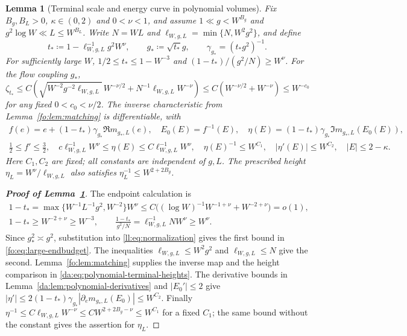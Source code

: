 \documentclass[11pt]{article}
\numberwithin{equation}{section}
\newtheorem{lemma}[theorem]{Lemma}
\theoremstyle{remark}
\newcommand{\ellstar}{\ell_{W,g,L}}
\begin{document}
\begin{lemma}[Terminal scale and energy curve in polynomial volumes]
\label{da:lem:polynomial-terminal}
Fix $B_g,B_L>0$, $\kappa\in(0,2)$ and $0<\nu<1$, and assume
$1\ll g<W^{B_g}$ and $g^2\log W\ll L\le W^{B_L}$.
Write $N=WL$ and $\ellstar=\min\{N,W^2g^2\}$, and define
\begin{equation}\label{ll:eq:endpoint}
 t_*\coloneqq1-\ellstar^{-1}g^2W^\nu,\qquad
 g_*\coloneqq\sqrt{t_*}g,\qquad \gamma_{g_*}=(t_*g^2)^{-1}.
\end{equation}
For sufficiently large $W$, $1/2\le t_*\le1-W^{-3}$ and
$(1-t_*)/(g^2/N)\ge W^\nu$. For the flow coupling $g_*$,
\begin{equation}\label{fo:eq:large-endbudget}
 \zeta_{t_*}\le C\left(
 \sqrt{W^{-2}g^{-2}\ellstar}\,W^{-\nu/2}
       +N^{-1}\ellstar W^{-\nu}\right)
 \le C(W^{-\nu/2}+W^{-\nu})\le W^{-c_0}
\end{equation}
for any fixed $0<c_0<\nu/2$. The inverse characteristic from
Lemma~\ref{fo:lem:matching} is differentiable, with
\begin{equation}\label{da:eq:polynomial-terminal-heights}
 \begin{gathered}
 f(e)=e+(1-t_*)\gamma_{g_*}\Re m_{g_*,L}(e),\quad
 E_0(E)=f^{-1}(E),\quad
 \eta(E)=(1-t_*)\gamma_{g_*}\Im m_{g_*,L}(E_0(E)),\\
 \tfrac12\le f'\le\tfrac32,\quad
 c\ellstar^{-1}W^\nu\le\eta(E)\le C\ellstar^{-1}W^\nu,\quad
 \eta(E)^{-1}\le W^{C_1},\quad |\eta'(E)|\le W^{C_2},\quad |E|\le2-\kappa.
 \end{gathered}
\end{equation}
Here $C_1,C_2$ are fixed; all constants are independent of $g,L$.
The prescribed height $\eta_L=W^\nu/\ellstar$ also satisfies
$\eta_L^{-1}\le W^{2+2B_g}$.
\end{lemma}
\begin{proof}[\textbf{Proof of Lemma~\ref{da:lem:polynomial-terminal}}]
The endpoint calculation is
\[
 \begin{gathered}
 1-t_*=\max\{W^{-1}L^{-1}g^2,W^{-2}\}W^\nu
 \le C\bigl((\log W)^{-1}W^{-1+\nu}+W^{-2+\nu}\bigr)=o(1),\\
 1-t_*\ge W^{-2+\nu}\ge W^{-3},\qquad
 \frac{1-t_*}{g^2/N}=\ellstar^{-1}NW^\nu\ge W^\nu.
 \end{gathered}
\]
Since $g_*^2\asymp g^2$, substitution into
\eqref{ll:eq:normalization} gives the first bound in
\eqref{fo:eq:large-endbudget}. The inequalities
$\ellstar\le W^2g^2$ and $\ellstar\le N$ give the second.
Lemma~\ref{fo:lem:matching} supplies the inverse map and the height
comparison in \eqref{da:eq:polynomial-terminal-heights}.
The derivative bounds in Lemma~\ref{da:lem:polynomial-derivatives}
and $|E_0'|\le2$ give
$|\eta'|\le2(1-t_*)\gamma_{g_*}
 |\partial_e m_{g_*,L}(E_0)|\le W^{C_2}$.
Finally $\eta^{-1}\le C\ellstar W^{-\nu}
\le CW^{2+2B_g-\nu}\le W^{C_1}$ for a fixed $C_1$;
the same bound without the constant gives the assertion for $\eta_L$.
\end{proof}
\end{document}
